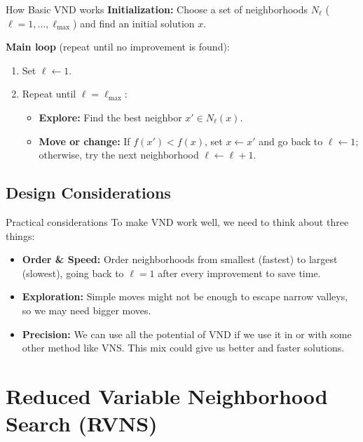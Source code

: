 \documentclass{beamer}
\begin{document}
\begin{frame}{How Basic VND works}
\textbf{Initialization:} Choose a set of neighborhoods $N_\ell$ ($\ell = 1, \dots, \ell_{\max}$) and find an initial solution $x$.

\vspace{0.2cm}
\textbf{Main loop} (repeat until no improvement is found):
\begin{enumerate}
\item Set $\ell \leftarrow 1$.
\item Repeat until $\ell = \ell_{\max}$:
    \begin{itemize}
    \item \textbf{Explore:} Find the best neighbor $x' \in N_\ell(x)$.
    \item \textbf{Move or change:} If $f(x') < f(x)$, set $x \leftarrow x'$ and go back to $\ell \leftarrow 1$; otherwise, try the next neighborhood $\ell \leftarrow \ell + 1$.
    \end{itemize}
\end{enumerate}
\end{frame}

\subsection{Design Considerations}
\begin{frame}{Practical considerations}
\quad To make VND work well, we need to think about three things:

\vspace{0.3cm}
\begin{itemize}
\item \textbf{Order \& Speed:} Order neighborhoods from smallest (fastest) to largest (slowest), going back to $\ell = 1$ after every improvement to save time.
\vspace{0.2cm}
\item \textbf{Exploration:} Simple moves might not be enough to escape narrow valleys, so we may need bigger moves.
\vspace{0.2cm}
\item \textbf{Precision:} We can use all the potential of VND if we use it in or with some other method like VNS. This mix could give us better and faster solutions.
\end{itemize}
\end{frame}



\section{Reduced Variable Neighborhood Search (RVNS)}
\end{document}
